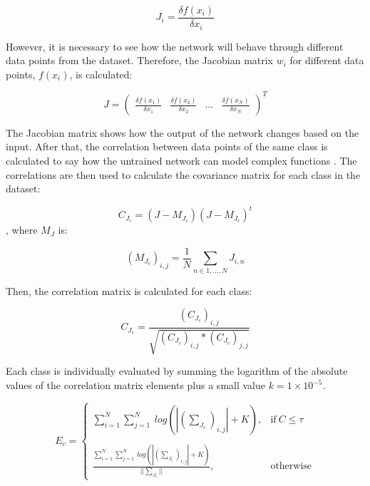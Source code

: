 \begin{equation}
    J_i = \frac{\delta f(x_i)}{\delta x_i}
    \label{eq:linear}
\end{equation}

However, it is necessary to see how the network will behave through different data points from the dataset. Therefore, the Jacobian matrix $w_i$ for different data points, $f(x_i)$, is calculated:

$$
J = \begin{pmatrix}
\frac{\delta f(x_1)}{\delta x_1} & \frac{\delta f(x_2)}{\delta x_2} & \dots & \frac{\delta f(x_N)}{\delta x_N} 
 \end{pmatrix}^T
$$

The Jacobian matrix shows how the output of the network changes based on the input. After that, the correlation between data points of the same class is calculated to say how the untrained network can model complex functions \autocite{lopes2021epe}. The correlations are then used to calculate the covariance matrix for each class in the dataset:

\begin{equation}
    C_{J_c} = (J - M_{J_c})(J-M_{J_c})^t
\end{equation}
, where $M_J$ is:

\begin{equation}
    (M_{J_c})_{i,j} = \frac{1}{N} \sum_{n \in {1,...,N}} J_{i,n}
\end{equation}

Then, the correlation matrix is calculated for each class:

\begin{equation}
    C_{J_c} = \frac{(C_{J_c})_{i,j}}{\sqrt{(C_{J_c})_{i,j} * (C_{J_c})_{j,j}}}
\end{equation}


Each class is individually evaluated by summing the logarithm of the absolute values of the correlation matrix elements plus a small value $k = 1 \times 10^{-5}$.

\begin{equation}
    E_c = 
    \begin{cases}
        \sum^N_{i=1} \sum^N_{j=1}\ log(|(\sum_{J_c})_{i,j}| + K), & \text{if}\ C \leq \tau \\ \\ 
        \frac{\sum^N_{i=1} \sum^N_{j=1}\ log(|(\sum_{J_c})_{i,j}| + K)}{||\sum_{J_c}||}, & \text{otherwise}
    \end{cases}
\end{equation}

